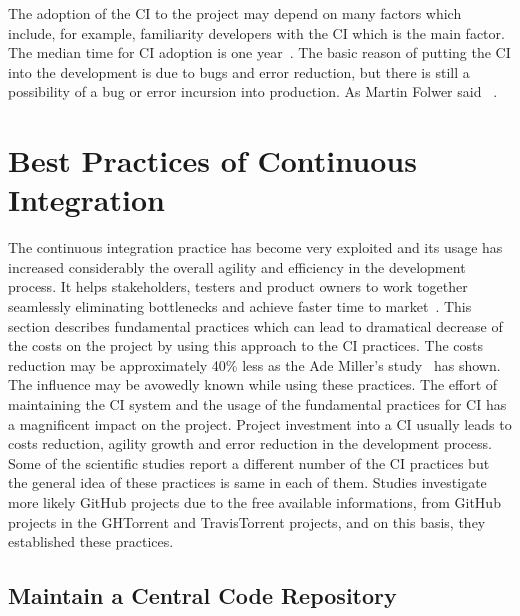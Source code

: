 The adoption of the CI to the project may depend on many factors which include, for example, familiarity developers with the CI which is the main factor. The median time for CI adoption is one year~\cite{COPE}. The basic reason of putting the CI into the development is due to bugs and error reduction, but there is still a possibility of a bug or error incursion into production. As Martin Folwer said ~\cite{MartinFowler}.

\section{Best Practices of Continuous Integration}

The continuous integration practice has become very exploited and its usage has increased considerably the overall agility and efficiency in the development process. It helps stakeholders, testers and product owners to work together seamlessly eliminating bottlenecks and achieve faster time to market~\cite{CI-BP1}. This section describes fundamental practices which can lead to dramatical decrease of the costs on the project by using this approach to the CI practices. The costs reduction may be approximately 40\% less as the Ade Miller's study~\cite{100DaysOfCI} has shown. The influence may be avowedly known while using these practices. The effort of maintaining the CI system and the usage of the fundamental practices for CI has a magnificent impact on the project. Project investment into a CI usually leads to costs reduction, agility growth and error reduction in the development process. Some of the scientific studies report a different number of the CI practices but the general idea of these practices is same in each of them. Studies investigate more likely GitHub projects due to the free available informations, from GitHub projects in the GHTorrent and TravisTorrent projects, and on this basis, they established these practices.

\subsection{Maintain a Central Code Repository}

